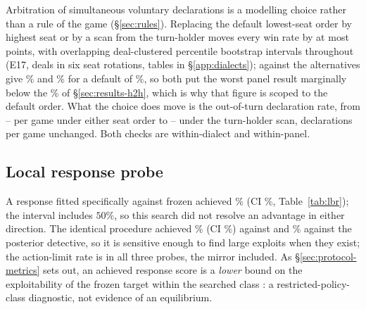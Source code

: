 Arbitration of simultaneous voluntary declarations is a modelling choice rather
than a rule of the game (\S\ref{sec:rules}). Replacing the default lowest-seat
order by highest seat or by a scan from the turn-holder moves every win rate by
at most \numArbMaxMove{} points, with overlapping deal-clustered percentile
bootstrap intervals throughout (E17, \numEseventeenDeals{} deals in six seat
rotations, tables in \S\ref{app:dialects}); against \vthree{} the alternatives
give \numArbHighVthree\% and \numArbTurnVthree\% for a default of \numVsVthree\%,
so both put the worst panel result marginally below the \numWorstCase\% of
\S\ref{sec:results-h2h}, which is why that figure is scoped to the default order.
What the choice does move is the out-of-turn declaration rate, from
\numArbOOTSeatLo--\numArbOOTSeatHi{} per game under either seat order to
\numArbOOTTurnLo--\numArbOOTTurnHi{} under the turn-holder scan, declarations per
game unchanged. Both checks are within-dialect and within-panel.

\subsection{Local response probe}
\label{sec:lbr}

\begin{table}[!htbp]
\centering
\caption{Local response probe (E10). Each row fits a fresh policy in the same
policy class, with the same optimiser and budget, whose only objective is to beat
the frozen policy named; fitting used seed $515253$, evaluation a separate bank
of \numLBRDeals{} deals in six seat rotations, \numLBRGames{} games per row, seed
$6543210$, target weights frozen. The win rate is what the response achieved, so
lower is better for the frozen policy. Intervals: deal-clustered percentile
bootstrap, \numBootstrapDraws{} resamples. Action-limit rate \numLBRLimit{} in
all three probes.}
\label{tab:lbr}
\small

\end{table}

A response fitted specifically against frozen \vfast{} achieved \numLBRFour\% (CI
\numLBRFourCI\%, Table~\ref{tab:lbr}); the interval includes $50\%$, so this
search did not resolve an advantage in either direction. The identical procedure
achieved \numLBRThree\% (CI \numLBRThreeCI\%) against \vthree{} and
\numLBRDetective\% against the posterior detective, so it is sensitive enough to
find large exploits when they exist; the action-limit rate is \numLBRLimit{} in
all three probes, the \vfast{} mirror included. As \S\ref{sec:protocol-metrics}
sets out, an achieved response score is a \emph{lower} bound on the
exploitability of the frozen target within the searched class \cite{lisy-lbr}: a
restricted-policy-class diagnostic, not evidence of an equilibrium.

